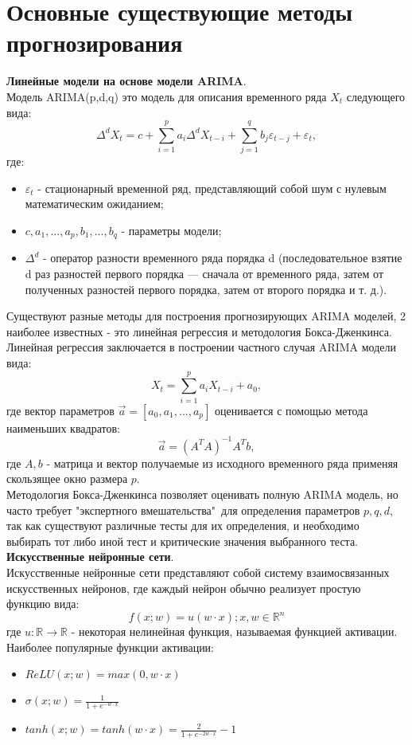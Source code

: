 \documentclass[11pt]{article}
\begin{document}
\section*{Основные существующие методы прогнозирования}
\textbf{Линейные модели на основе модели ARIMA}.
\\
Модель ARIMA(p,d,q) это модель для описания временного ряда $X_t$ следующего вида:
$$\Delta^dX_t = c + \sum_{i=1}^{p}{a_i\Delta^dX_{t-i}} + \sum_{j=1}^{q}{b_j\varepsilon_{t-j} + \varepsilon_t},$$
где:
\begin{itemize}
\item $\varepsilon_t$ - стационарный временной ряд, представляющий собой шум с нулевым математическим ожиданием;
\item $ c, a_1, ..., a_p, b_1, ..., b_q $ - параметры модели;
\item $\Delta^d$ - оператор разности временного ряда порядка d (последовательное взятие d раз разностей первого порядка — сначала от временного ряда, затем от полученных разностей первого порядка, затем от второго порядка и т. д.).
\end{itemize}
Существуют разные методы для построения прогнозирующих ARIMA моделей, 2 наиболее известных - это линейная регрессия и методология Бокса-Дженкинса. Линейная регрессия заключается в построении частного случая ARIMA модели вида:
$$X_t = \sum_{i=1}^{p}{a_iX_{t-i}} + a_0 ,$$
где вектор параметров $\vec{a} = [a_0, a_1, ..., a_p]$ оценивается с помощью метода наименьших квадратов:
$$ \vec{a} = {(A^TA)}^{-1}A^Tb ,$$
где $A, b$ - матрица и вектор получаемые из исходного временного ряда применяя скользящее окно размера $p$.
\\
Методология Бокса-Дженкинса позволяет оценивать полную ARIMA модель, но часто требует "экспертного вмешательства"\ для определения параметров $p,q,d$, так как существуют различные тесты для их определения, и необходимо выбирать тот либо иной тест и критические значения выбранного теста.
\\
\textbf{Искусственные нейронные сети}.
\\
Искусственные нейронные сети представляют собой систему взаимосвязанных искусственных нейронов, где каждый нейрон обычно реализует простую функцию вида:
$$ f(x;w) = u(w \cdot x); x,w \in \mathbb{R}^n $$
где $u: \mathbb{R} \to \mathbb{R} $ - некоторая нелинейная функция, называемая функцией активации. Наиболее популярные функции активации:
\begin{itemize}
\item $ReLU(x;w) = max(0,w \cdot x)$
\item $ \sigma(x;w) = \frac{1}{1 + e^{-w \cdot x}} $
\item $ tanh(x;w) = tanh(w \cdot x) = \frac{2}{1 + e^{-2 w \cdot x}} - 1$
\end{itemize}
\end{document}
